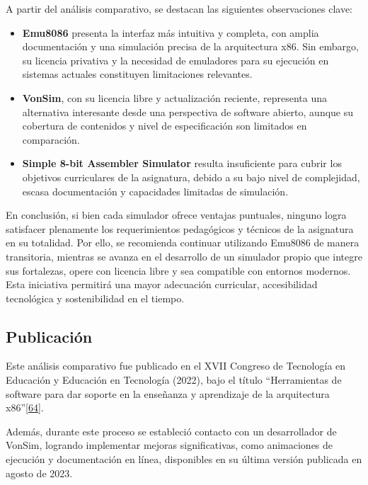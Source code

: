 \documentclass[12pt,oneside]{templates/unerthesis}
\providecommand{\tightlist}{%
  \setlength{\itemsep}{0pt}\setlength{\parskip}{0pt}}
\begin{document}
A partir del análisis comparativo, se destacan las siguientes observaciones clave:

\begin{itemize}
\tightlist
\item
  \textbf{Emu8086} presenta la interfaz más intuitiva y completa, con amplia documentación y una simulación precisa de la arquitectura x86. Sin embargo, su licencia privativa y la necesidad de emuladores para su ejecución en sistemas actuales constituyen limitaciones relevantes.
\item
  \textbf{VonSim}, con su licencia libre y actualización reciente, representa una alternativa interesante desde una perspectiva de software abierto, aunque su cobertura de contenidos y nivel de especificación son limitados en comparación.
\item
  \textbf{Simple 8-bit Assembler Simulator} resulta insuficiente para cubrir los objetivos curriculares de la asignatura, debido a su bajo nivel de complejidad, escasa documentación y capacidades limitadas de simulación.
\end{itemize}

En conclusión, si bien cada simulador ofrece ventajas puntuales, ninguno logra satisfacer plenamente los requerimientos pedagógicos y técnicos de la asignatura en su totalidad. Por ello, se recomienda continuar utilizando Emu8086 de manera transitoria, mientras se avanza en el desarrollo de un simulador propio que integre sus fortalezas, opere con licencia libre y sea compatible con entornos modernos. Esta iniciativa permitirá una mayor adecuación curricular, accesibilidad tecnológica y sostenibilidad en el tiempo.

\hypertarget{publicaciuxf3n}{%
\subsection{Publicación}\label{publicaciuxf3n}}

Este análisis comparativo fue publicado en el XVII Congreso de Tecnología en Educación y Educación en Tecnología (2022), bajo el título ``Herramientas de software para dar soporte en la enseñanza y aprendizaje de la arquitectura x86''\protect\hyperlink{ref-colombani_herramientas_2022}{{[}64{]}}.

Además, durante este proceso se estableció contacto con un desarrollador de VonSim, logrando implementar mejoras significativas, como animaciones de ejecución y documentación en línea, disponibles en su última versión publicada en agosto de 2023.
\end{document}
